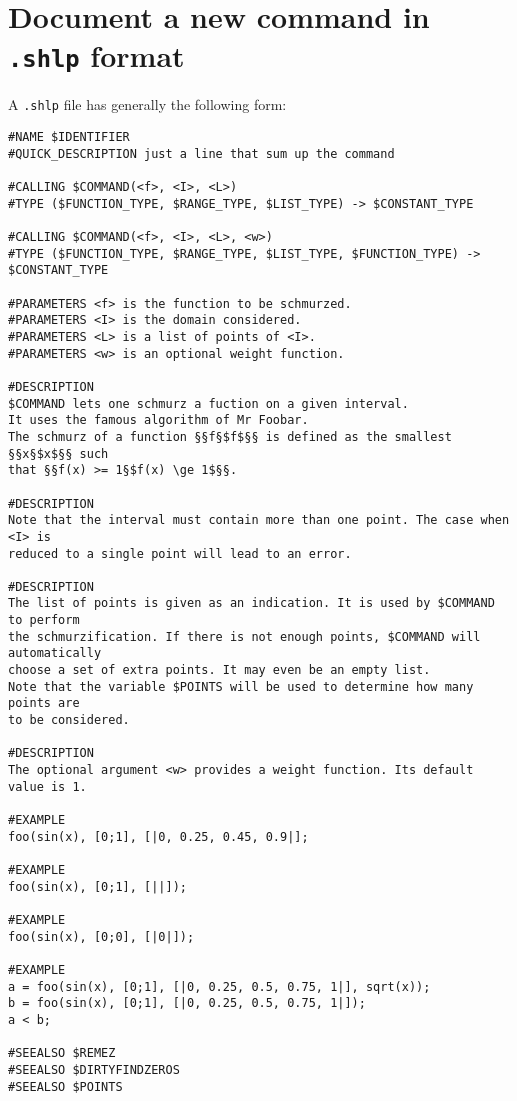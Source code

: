 \documentclass{article}
\begin{document}
\section{Document a new command in \texttt{.shlp} format}
\label{writeShlp}
A \texttt{.shlp} file has generally the following form:
\begin{verbatim}
#NAME $IDENTIFIER
#QUICK_DESCRIPTION just a line that sum up the command

#CALLING $COMMAND(<f>, <I>, <L>)
#TYPE ($FUNCTION_TYPE, $RANGE_TYPE, $LIST_TYPE) -> $CONSTANT_TYPE

#CALLING $COMMAND(<f>, <I>, <L>, <w>)
#TYPE ($FUNCTION_TYPE, $RANGE_TYPE, $LIST_TYPE, $FUNCTION_TYPE) -> $CONSTANT_TYPE

#PARAMETERS <f> is the function to be schmurzed.
#PARAMETERS <I> is the domain considered.
#PARAMETERS <L> is a list of points of <I>.
#PARAMETERS <w> is an optional weight function.

#DESCRIPTION 
$COMMAND lets one schmurz a fuction on a given interval.
It uses the famous algorithm of Mr Foobar.
The schmurz of a function §§f§$f$§§ is defined as the smallest §§x§$x$§§ such
that §§f(x) >= 1§$f(x) \ge 1$§§. 

#DESCRIPTION
Note that the interval must contain more than one point. The case when <I> is
reduced to a single point will lead to an error.

#DESCRIPTION
The list of points is given as an indication. It is used by $COMMAND to perform
the schmurzification. If there is not enough points, $COMMAND will automatically
choose a set of extra points. It may even be an empty list.
Note that the variable $POINTS will be used to determine how many points are
to be considered.

#DESCRIPTION
The optional argument <w> provides a weight function. Its default value is 1.

#EXAMPLE
foo(sin(x), [0;1], [|0, 0.25, 0.45, 0.9|];

#EXAMPLE
foo(sin(x), [0;1], [||]);

#EXAMPLE
foo(sin(x), [0;0], [|0|]);

#EXAMPLE
a = foo(sin(x), [0;1], [|0, 0.25, 0.5, 0.75, 1|], sqrt(x));
b = foo(sin(x), [0;1], [|0, 0.25, 0.5, 0.75, 1|]);
a < b;

#SEEALSO $REMEZ
#SEEALSO $DIRTYFINDZEROS
#SEEALSO $POINTS
\end{verbatim}\newpage
\end{document}
